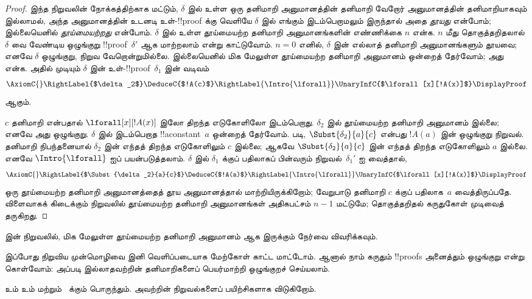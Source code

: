 \documentclass[../../../include/open-logic-section]{subfiles}
\begin{document}
\begin{proof}
இந்த நிறுவலின் நோக்கத்திற்காக மட்டும், $\delta$
இல் உள்ள ஒரு தனிமாறி அனுமானத்தின் தனிமாறி
வேறோர் அனுமானத்தின் தனிமாறியாகவும் இல்லாமல்,
அந்த அனுமானத்தின் உடனடி உள்-!!{proof} க்கு
வெளியே $\delta$ இல் எங்கும் இடம்பெறாமலும்
இருந்தால் அதை \emph{தூயது} என்போம்;
இல்லையெனில் \emph{தூய்மையற்றது} என்போம்.
$\delta$ இல் உள்ள தூய்மையற்ற தனிமாறி
அனுமானங்களின் எண்ணிக்கை $n$ என்க.
$n$ மீது தொகுத்தறிதலால் $\delta$ வை வேண்டிய
ஒழுங்குறு !!{proof}~$\delta'$ ஆக மாற்றலாம்
என்று காட்டுவோம். $n=0$ எனில்,
$\delta$ இன் எல்லாத் தனிமாறி அனுமானங்களும்
தூயவை; எனவே $\delta$ ஒழுங்குறு, நிறுவ
வேறொன்றுமில்லை. இல்லையெனில் மிக மேலுள்ள
தூய்மையற்ற தனிமாறி அனுமானம் ஒன்றைத் தேர்வோம்;
அது \Intro{\lforall} என்க. அதில் முடியும்
$\delta$ இன் உள்-!!{proof}~$\delta_1$ இன் வடிவம்
    \[
    \AxiomC{}
    \RightLabel{$\delta_2$}
    \DeduceC{$!A(c)$}
    \RightLabel{\Intro{\lforall}}
    \UnaryInfC{$\lforall[x][!A(x)]$}
    \DisplayProof
    \]
ஆகும்.

$c$ தனிமாறி என்பதால்
$\lforall[x][!A(x)]$ இலோ திறந்த எடுகோளிலோ
இடம்பெறாது. $\delta_2$ இல் தூய்மையற்ற
தனிமாறி அனுமானம் இல்லை; எனவே அது ஒழுங்குறு.
$\delta$ இல் இடம்பெறாத !!a{constant}~$a$
ஒன்றைத் தேர்வோம்.  படி,
$\Subst{\delta_2}{a}{c}$ என்பது $!A(a)$ இன்
ஒழுங்குறு நிறுவல். தனிமாறி நிபந்தனையால்
$\delta_2$ இன் எந்தத் திறந்த எடுகோளிலும்
$c$ இல்லை; ஆகவே
$\Subst{\delta_2}{a}{c}$ இன் எந்தத் திறந்த
எடுகோளிலும் $a$ இல்லை. எனவே
$\Intro{\lforall}$ ஐப் பயன்படுத்தலாம்.
$\delta$ இல் $\delta_1$ க்குப் பதிலாகப் பின்வரும்
நிறுவல்~$\delta_1'$ ஐ வைத்தால்,
    \[
    \AxiomC{}
    \RightLabel{$\Subst{\delta_2}{a}{c}$}
    \DeduceC{$!A(a)$}
    \RightLabel{\Intro{\lforall}}
    \UnaryInfC{$\lforall[x][!A(x)]$}
    \DisplayProof
    \]
ஒரு தூய்மையற்ற தனிமாறி அனுமானத்தைத்
தூய அனுமானத்தால் மாற்றியிருக்கிறோம்;
வேறுபாடு தனிமாறி $c$ க்குப் பதிலாக~$a$
வைத்திருப்பதே. விளைவாகக் கிடைக்கும் நிறுவலில்
தூய்மையற்ற தனிமாறி அனுமானங்கள் அதிகபட்சம்
$n-1$ மட்டுமே; தொகுத்தறிதல் கருதுகோள்
முடிவைத் தருகிறது.
\end{proof}

\begin{prob}
 இன் நிறுவலில்,
மிக மேலுள்ள தூய்மையற்ற தனிமாறி அனுமானம்
\Elim{\lexists} ஆக இருக்கும் நேர்வை விவரிக்கவும்.
\end{prob}

இப்போது நிறுவிய முன்மொழிவை இனி வெளிப்படையாக
மேற்கோள் காட்ட மாட்டோம். ஆனால் நாம் கருதும்
!!{proof}s அனைத்தும் ஒழுங்குறு என்று கொள்வோம்:
அப்படி இல்லாதவற்றின் தனிமாறிகளைப்
பெயர்மாற்றி ஒழுங்குறச் செய்யலாம்.

 உம்
 உம்  மற்றும்~
 க்கும் பொருந்தும். அவற்றின்
நிறுவல்களைப் பயிற்சிகளாக விடுகிறோம்.
\end{document}
